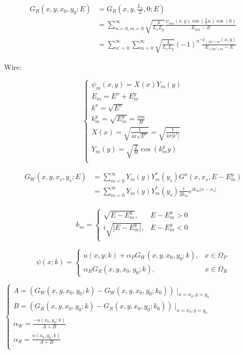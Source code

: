 \documentclass[12pt, a4paper]{article}
\begin{document}
\begin{align*}
G_R(x, y, x_0, y_0; E)
&= G_R(x, y, \frac{L_x}{2}, 0; E) \\
&= \sum\limits_{n = 0, m = 0}^\infty \sqrt{\frac{4}{L_x L_y}} \frac{\psi_{nm}(x, y) \cos(\frac{\pi}{2} n) \cos(0)}{E_{nm} - E} \\
&= \sum\limits_{n' = 0}^\infty \sum\limits_{m = 0}^\infty \sqrt{\frac{4}{L_x L_y}} (-1)^{n'} \frac{\psi_{(2n')m}(x, y)}{E_{(2n')m} - E}
\end{align*}

Wire:

$$\begin{cases}
\psi_{m}(x, y) = X(x) Y_m(y) \\
E_{m} = E^x + E^y_m \\
k^x = \sqrt{E^x} \\
k^y_m = \sqrt{E^y_m} = \frac{\pi m}{H} \\
X(x) = \sqrt{\frac{1}{4 \pi \sqrt{E^x}}} = \sqrt{\frac{1}{4 \pi |k^x|}} \\
Y_m(y) = \sqrt{\frac{2}{H}} \cos(k^y_m y) \\
\end{cases}$$

\begin{align*}
G_W(x, y, x_s, y_s; E)
&= \sum\limits_{m = 0}^\infty Y_m(y) Y_m^*(y_s) G^x(x, x_s, E - E^y_m) \\
&= \sum\limits_{m = 0}^\infty Y_m(y) Y_m^*(y_s) \frac{i}{2 k_m} e^{i k_m |x - x_s|} \\
\end{align*}

$$k_m =
\begin{cases}
\sqrt{E - E^y_m}, & E - E^y_m > 0 \\
i \sqrt{|E - E^y_m|}, & E - E^y_m < 0 \\
\end{cases}$$


$$\psi(x; k) =
\begin{cases}
u(x, y; k) + \alpha_P G_W(x, y, x_0, y_0; k), & x \in \Omega_P \\
\alpha_R G_R(x, y, x_0, y_0; k), & x \in \Omega_R
\end{cases}
$$

$\begin{cases}
A = (G_W(x, y, x_0, y_0; k) - G_W(x, y, x_0, y_0; k_0)) \mid_{x = x_0, y = y_0} \\
B = (G_R(x, y, x_0, y_0; k) - G_R(x, y, x_0, y_0; k_0)) \mid_{x = x_0, y = y_0} \\
\alpha_W = \frac{-u(x_0, y_0; k)}{A + B} \\
\alpha_R = \frac{u(x_0, y_0; k)}{A + B} \\
\end{cases}$
\end{document}
